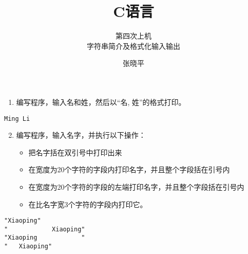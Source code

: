 \documentclass[12pt,notheorems]{beamer}
\begin{document}
\title{C语言}
\subtitle{第四次上机\\ 字符串简介及格式化输入输出}
\author{张晓平}


\begin{frame}[plain]\transboxout
\titlepage
\end{frame}

\begin{frame}\transboxin
\begin{center}
\tableofcontents[]%
\end{center}
\end{frame}

\AtBeginSection[]{
\begin{frame}[allowframebreaks]
\tableofcontents[currentsection,sectionstyle=show/hide]
\end{frame}
}

\begin{frame}[fragile] 
\begin{enumerate}\setcounter{enumi}{0} 
\item 编写程序，输入名和姓，然后以“名, 姓”的格式打印。
\end{enumerate}

\begin{lstlisting}[backgroundcolor=\color{red!10}]
Ming Li
\end{lstlisting}
\end{frame}

\begin{frame}[fragile] 

\end{frame}

\begin{frame}[fragile] 
\begin{enumerate}\setcounter{enumi}{1} 
\item 编写程序，输入名字，并执行以下操作：\\[0.05in]
\begin{itemize}
\item 把名字括在双引号中打印出来\\[0.1in]
\item 在宽度为20个字符的字段内打印名字，并且整个字段括在引号内\\[0.1in]
\item 在宽度为20个字符的字段的左端打印名字，并且整个字段括在引号内\\[0.1in]
\item 在比名字宽3个字符的字段内打印它。
\end{itemize}
\end{enumerate}

\begin{lstlisting}[showspaces=true,backgroundcolor=\color{red!10}]
"Xiaoping"
"            Xiaoping"
"Xiaoping            "
"   Xiaoping"
\end{lstlisting}
\end{frame}
\end{document}
